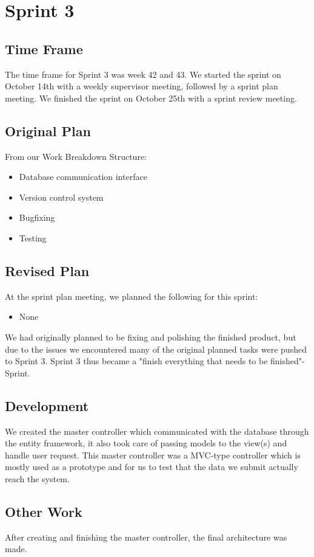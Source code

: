 \section{Sprint 3}

\subsection{Time Frame}
The time frame for Sprint 3 was week 42 and 43. We started the sprint on October 14th with a weekly supervisor meeting, followed by a sprint plan meeting. We finished the sprint on October 25th with a sprint review meeting.

\subsection{Original Plan}
From our Work Breakdown Structure:
\begin{itemize}
	\item Database communication interface
	\item Version control system
	\item Bugfixing
	\item Testing
\end{itemize}

\subsection{Revised Plan}
At the sprint plan meeting, we planned the following for this sprint:
\begin{itemize}
	\item None
\end{itemize}
We had originally planned to be fixing and polishing the finished product, but due to the issues we encountered many of the original planned tasks were pushed to Sprint 3. Sprint 3 thus became a "finish everything that needs to be finished"-Sprint.

\subsection{Development}
We created the master controller which communicated with the database through the entity framework, it also took care of passing models to the view(s) and handle user request. This master controller was a MVC-type controller which is mostly used as a prototype and for us to test that the data we submit actually reach the system.

\subsection{Other Work}
After creating and finishing the master controller, the final architecture was made.

